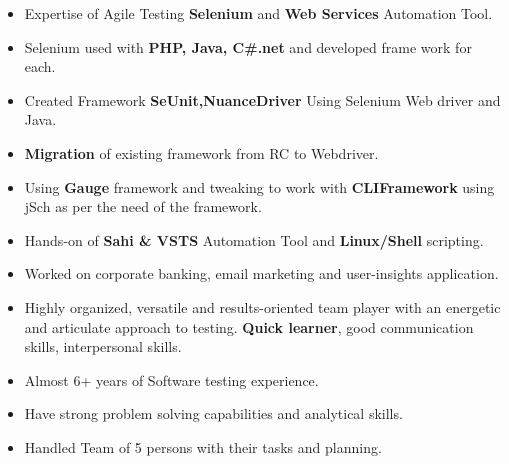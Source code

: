 

\begin{cvparagraph}

\begin{itemize}
 \item Expertise of Agile Testing \textbf{Selenium} and \textbf{Web Services} Automation Tool.

 \item Selenium used with \textbf{PHP, Java, C\#.net} and developed frame work for each.

 \item Created Framework \textbf{SeUnit,NuanceDriver} Using Selenium Web driver and Java.

 \item \textbf{Migration} of existing framework from RC to Webdriver.

 \item Using \textbf{Gauge} framework and tweaking to work with \textbf{CLIFramework} using jSch as per the need of the framework.

 \item Hands-on of \textbf{Sahi \& VSTS} Automation Tool and \textbf{Linux/Shell} scripting.

 \item Worked on corporate banking, email marketing and user-insights application.

 \item Highly organized, versatile and results-oriented team player with an energetic and articulate approach to testing. \textbf{Quick learner}, good communication skills, interpersonal skills.

 \item Almost 6+ years of Software testing experience.

 \item Have strong problem solving capabilities and analytical skills.

 \item Handled Team of 5 persons with their tasks and planning.
\end{itemize}
\end{cvparagraph}
